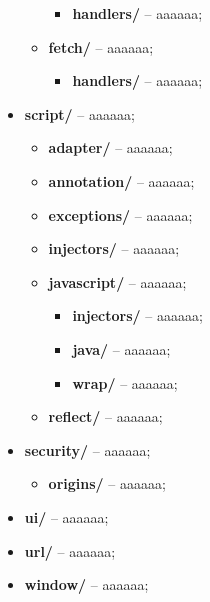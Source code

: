 \begin{itemize}
\begin{itemize}
\begin{itemize}
           \item[] \textbf{handlers/} -- aaaaaa;
         \end{itemize}
       \item[] \textbf{fetch/} -- aaaaaa;
         \begin{itemize}
           \item[] \textbf{handlers/} -- aaaaaa;
         \end{itemize}
     \end{itemize}
  \item[] \textbf{script/} -- aaaaaa;
     \begin{itemize}
       \item[] \textbf{adapter/} -- aaaaaa;
       \item[] \textbf{annotation/} -- aaaaaa;
       \item[] \textbf{exceptions/} -- aaaaaa;
       \item[] \textbf{injectors/} -- aaaaaa;
       \item[] \textbf{javascript/} -- aaaaaa;
         \begin{itemize}
           \item[] \textbf{injectors/} -- aaaaaa;
           \item[] \textbf{java/} -- aaaaaa;
           \item[] \textbf{wrap/} -- aaaaaa;
         \end{itemize}
       \item[] \textbf{reflect/} -- aaaaaa;
     \end{itemize}
  \item[] \textbf{security/} -- aaaaaa;
     \begin{itemize}
       \item[] \textbf{origins/} -- aaaaaa;
     \end{itemize}
  \item[] \textbf{ui/} -- aaaaaa;
  \item[] \textbf{url/} -- aaaaaa;
  \item[] \textbf{window/} -- aaaaaa;
\end{itemize}


